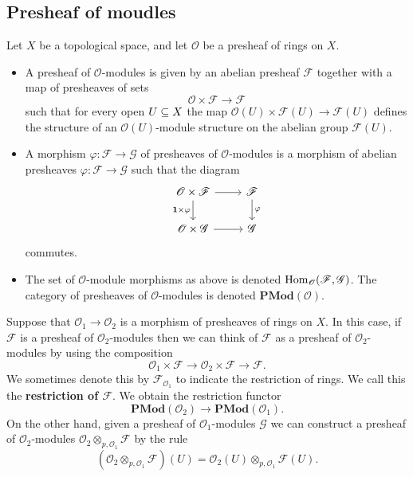 \subsection{Presheaf of moudles}
\begin{definition}
Let $X$ be a topological space, and let $\mathscr{O}$ be a presheaf of rings
on $X$.
\begin{itemize}
\item A presheaf of $\mathscr{O}$-modules is given by an abelian presheaf $\mathscr{F}$ together with a map of presheaves of sets
\[\mathscr{O}\times\mathscr{F}\to\mathscr{F}\]
such that for every open $U\subseteq X$ the map $\mathscr{O}(U)\times\mathscr{F}(U)\to\mathscr{F}(U)$ defines the structure of an $\mathscr{O}(U)$-module structure on the abelian group $\mathscr{F}(U)$.
\item A morphism $\varphi:\mathscr{F}\to\mathscr{G}$ of presheaves of $\mathscr{O}$-modules is a morphism of abelian presheaves $\varphi:\mathscr{F}\to\mathscr{G}$ such that the diagram 
\[\begin{tikzcd}
\mathscr{O}\times\mathscr{F}\ar[r]\ar[d,swap,"\mathbf{1}\times\varphi"]&\mathscr{F}\ar[d,"\varphi"]\\
\mathscr{O}\times\mathscr{G}\ar[r]&\mathscr{G}
\end{tikzcd}\]
commutes.
\item The set of $\mathscr{O}$-module morphisms as above is denoted $\mathrm{Hom}_{\mathscr{O}}(\mathscr{F},\mathscr{G})$. The category of presheaves of $\mathscr{O}$-modules is denoted $\mathbf{PMod}(\mathscr{O})$.
\end{itemize}
\end{definition}
Suppose that $\mathscr{O}_1\to\mathscr{O}_2$ is a morphism of presheaves of rings on $X$. In this case, if $\mathscr{F}$ is a presheaf of $\mathscr{O}_2$-modules then we can think of $\mathscr{F}$ as a presheaf of $\mathscr{O}_2$-modules by using the composition
\[\mathscr{O}_1\times\mathscr{F}\to\mathscr{O}_2\times\mathscr{F}\to\mathscr{F}.\]
We sometimes denote this by $\mathscr{F}_{\mathscr{O}_1}$ to indicate the restriction of rings. We call this the \textbf{restriction of $\mathscr{F}$}. We obtain the restriction functor
\[\mathbf{PMod}(\mathscr{O}_2)\to\mathbf{PMod}(\mathscr{O}_1).\]
On the other hand, given a presheaf of $\mathscr{O}_1$-modules $\mathscr{G}$ we can construct a presheaf of $\mathscr{O}_2$-modules $\mathscr{O}_2\otimes_{p,\mathscr{O}_1}\mathscr{F}$ by the rule
\[(\mathscr{O}_2\otimes_{p,\mathscr{O}_1}\mathscr{F})(U)=\mathscr{O}_2(U)\otimes_{p,\mathscr{O}_1}\mathscr{F}(U).\]
